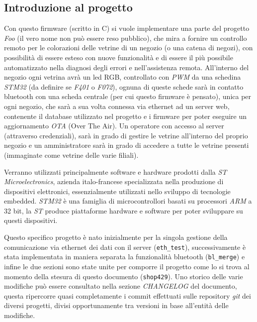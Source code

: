 \subsection{Introduzione al progetto}

Con questo firmware (scritto in C) si vuole implementare una parte del progetto \textit{Foo} (il vero nome non pu\`o essere reso pubblico), che mira a fornire un controllo remoto per le colorazioni delle vetrine di un negozio (o una catena di negozi), con possibilit\`a di essere esteso con nuove funzionalit\`a e di essere il pi\`u possibile automatizzato nella diagnosi degli errori e nell'assistenza remota. All'interno del negozio ogni vetrina avr\`a un led RGB, controllato con \textit{PWM} da una schedina \textit{STM32} (da definire se \textit{F401} o \textit{F072}), ognuna di queste schede sar\`a in contatto bluetooth con una scheda centrale (per cui questo firmware \`e pensato), unica per ogni negozio, che sar\`a a sua volta connessa via ethernet ad un server web, contenente il database utilizzato nel progetto e i firmware per poter eseguire un aggiornamento \textit{OTA} (Over The Air). Un operatore con accesso al server (attraverso credenziali), sar\`a in grado di gestire le vetrine all'interno del proprio negozio e un amministratore sar\`a in grado di accedere a tutte le vetrine presenti (immaginate come vetrine delle varie filiali).

Verranno utilizzati principalmente software e hardware prodotti dalla \textit{ST Microelectronics}, azienda italo-francese specializzata nella produzione di dispositivi elettronici, essenzialmente utilizzati nello sviluppo di tecnologie embedded. \textit{STM32} \`e una famiglia di microcontrollori basati su processori \textit{ARM} a 32 bit, la \textit{ST} produce piattaforme hardware e software per poter sviluppare su questi dispositivi.

Questo specifico progetto \`e nato inizialmente per la singola gestione della comunicazione via ethernet dei dati con il server (\texttt{eth\_test}), successivamente \`e stata implementata in maniera separata la funzionalit\`a bluetooth (\texttt{bl\_merge}) e infine le due sezioni sono state unite per comporre il progetto come lo si trova al momento della stesura di questo documento (\texttt{shop429}). Uno storico delle varie modifiche pu\`o essere consultato nella sezione \textit{CHANGELOG} del documento, questa ripercorre quasi completamente i commit effettuati sulle repository \textit{git} dei diversi progetti, divisi opportunamente tra versioni in base all'entit\`a delle modifiche.

